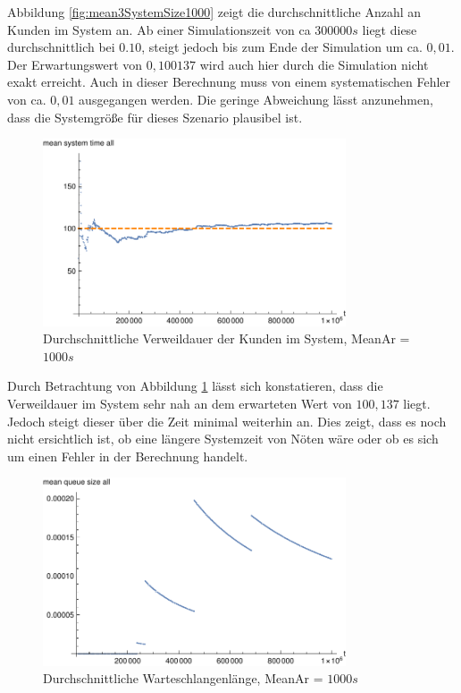 Abbildung \ref{fig:mean3SystemSize1000} zeigt die durchschnittliche Anzahl an Kunden im System an. Ab einer Simulationszeit von ca $300000s$ liegt diese durchschnittlich bei $0.10$, steigt jedoch bis zum Ende der Simulation um ca. $0,01$. Der Erwartungswert von $0,100137$ wird auch hier durch die Simulation nicht exakt erreicht. Auch in dieser Berechnung muss von einem systematischen Fehler von ca. $0,01$ ausgegangen werden. Die geringe Abweichung lässt anzunehmen, dass die Systemgröße für dieses Szenario plausibel ist.

\begin{figure}[htpb]
	\centering
	\includegraphics[width=0.8\textwidth]{abbildungen/2_Phone_VIP/Arrival_1000_Serve_100_dur_1000000_Skip_0/MeanSystemTimeAll.pdf}
	\caption{Durchschnittliche Verweildauer der Kunden im System, MeanAr = $1000s$}
	\label{fig:mean3SystemTime1000}
\end{figure}

Durch Betrachtung von Abbildung \ref{fig:mean3SystemTime1000} lässt sich konstatieren, dass die Verweildauer im System sehr nah an dem erwarteten Wert von $100,137$ liegt. Jedoch steigt dieser über die Zeit minimal weiterhin an. Dies zeigt, dass es noch nicht ersichtlich ist, ob eine längere Systemzeit von Nöten wäre oder ob es sich um einen Fehler in der Berechnung handelt.

\begin{figure}[htpb]
	\centering
	\includegraphics[width=0.8\textwidth]{abbildungen/2_Phone_VIP/Arrival_1000_Serve_100_dur_1000000_Skip_0/MeanQueueSizeAll.pdf}
	\caption{Durchschnittliche Warteschlangenlänge, MeanAr = $1000s$}
	\label{fig:mean3QueueSize1000}
\end{figure}

